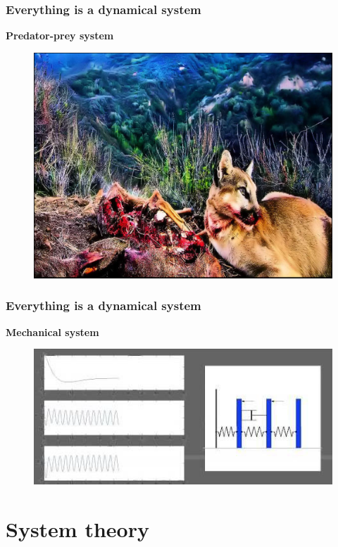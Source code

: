 \documentclass{beamer}
\begin{document}

\begin{frame}
\frametitle{Everything is a dynamical system}
\textbf{Predator-prey system}
\begin{figure}
\includegraphics[width=0.8\linewidth]{predator_prey}
\end{figure}
\end{frame}


\begin{frame}
\frametitle{Everything is a dynamical system}
\textbf{Mechanical system}
\begin{figure}
\includegraphics[width=1\linewidth]{mechanical_system}
\end{figure}
\end{frame}

\section{System theory} 
\end{document}
